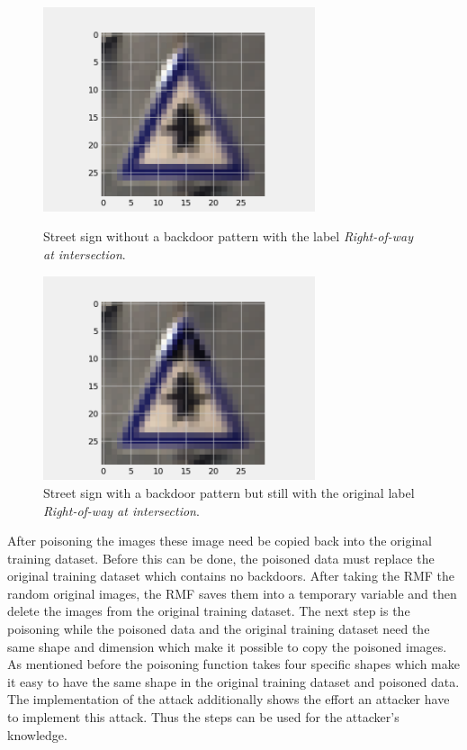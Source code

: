 \begin{figure}[!tbp]
  \centering
  \begin{minipage}[b]{0.4\textwidth}
    \includegraphics[width=8cm]{pictures/original_example.png}
    \caption{Street sign without a backdoor pattern with the label \textit{Right-of-way at intersection}.}
    \label{fig:original_example}
  \end{minipage}
  \hfill
  \begin{minipage}[b]{0.4\textwidth}
    \includegraphics[width=8cm]{pictures/poisoned_example.png}
    \caption{Street sign with a backdoor pattern but still with the original label \textit{Right-of-way at intersection}.}
    \label{fig:poisoned_example}
  \end{minipage}
\end{figure}

After poisoning the images these image need be copied back into the original training dataset. Before this can be done, the poisoned data must replace the original training dataset which contains
no backdoors. After taking the RMF the random original images, the RMF saves them into a temporary variable and then delete the images from the original training dataset. The next step is the
poisoning while the poisoned data and the original training dataset need the same shape and dimension which make it possible to copy the poisoned images. As mentioned before the poisoning
function takes four specific shapes which make it easy to have the same shape in the original training dataset and poisoned data. The implementation of the attack additionally shows the
effort an attacker have to implement this attack. Thus the steps can be used for the attacker's knowledge.

